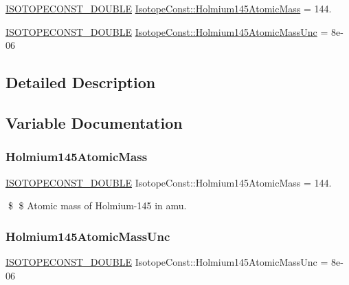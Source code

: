 \begin{DoxyCompactItemize}
\item 
\mbox{\hyperlink{group___isotope_const-_macros_ga8f45a7272ce02c0b4c65c44636ed719a}{I\+S\+O\+T\+O\+P\+E\+C\+O\+N\+S\+T\+\_\+\+D\+O\+U\+B\+LE}} \mbox{\hyperlink{group___isotope_const-_holmium-_ho145_gad7b5b3e53ad442227d3187fc67cb1dee}{Isotope\+Const\+::\+Holmium145\+Atomic\+Mass}} = 144.
\item 
\mbox{\hyperlink{group___isotope_const-_macros_ga8f45a7272ce02c0b4c65c44636ed719a}{I\+S\+O\+T\+O\+P\+E\+C\+O\+N\+S\+T\+\_\+\+D\+O\+U\+B\+LE}} \mbox{\hyperlink{group___isotope_const-_holmium-_ho145_ga49a268421820d5f60a9a9a04a3c7ce63}{Isotope\+Const\+::\+Holmium145\+Atomic\+Mass\+Unc}} = 8e-\/06
\end{DoxyCompactItemize}


\subsection{Detailed Description}


\subsection{Variable Documentation}
\mbox{\label{group___isotope_const-_holmium-_ho145_gad7b5b3e53ad442227d3187fc67cb1dee}} 
\subsubsection{\texorpdfstring{Holmium145\+Atomic\+Mass}{Holmium145AtomicMass}}
{\footnotesize\ttfamily \mbox{\hyperlink{group___isotope_const-_macros_ga8f45a7272ce02c0b4c65c44636ed719a}{I\+S\+O\+T\+O\+P\+E\+C\+O\+N\+S\+T\+\_\+\+D\+O\+U\+B\+LE}} Isotope\+Const\+::\+Holmium145\+Atomic\+Mass = 144.}

\$ \$ Atomic mass of Holmium-\/145 in amu. \mbox{\label{group___isotope_const-_holmium-_ho145_ga49a268421820d5f60a9a9a04a3c7ce63}} 
\subsubsection{\texorpdfstring{Holmium145\+Atomic\+Mass\+Unc}{Holmium145AtomicMassUnc}}
{\footnotesize\ttfamily \mbox{\hyperlink{group___isotope_const-_macros_ga8f45a7272ce02c0b4c65c44636ed719a}{I\+S\+O\+T\+O\+P\+E\+C\+O\+N\+S\+T\+\_\+\+D\+O\+U\+B\+LE}} Isotope\+Const\+::\+Holmium145\+Atomic\+Mass\+Unc = 8e-\/06}

